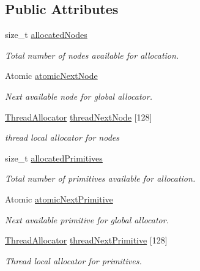 \subsection*{Public Attributes}
\begin{DoxyCompactItemize}
\item 
\hypertarget{classembree_1_1_builder_ad7a981fa7a2855b1efd27d5748ca564b}{
size\_\-t \hyperlink{classembree_1_1_builder_ad7a981fa7a2855b1efd27d5748ca564b}{allocatedNodes}}
\label{classembree_1_1_builder_ad7a981fa7a2855b1efd27d5748ca564b}

\begin{DoxyCompactList}\small\item\em Total number of nodes available for allocation. \item\end{DoxyCompactList}\item 
Atomic \hyperlink{classembree_1_1_builder_a5de33d69fa2c9fb5057672a268e4485e}{atomicNextNode}
\begin{DoxyCompactList}\small\item\em Next available node for global allocator. \item\end{DoxyCompactList}\item 
\hypertarget{classembree_1_1_builder_a9bcfa909ab6e789c27cb6007d18d0555}{
\hyperlink{structembree_1_1_builder_1_1_thread_allocator}{ThreadAllocator} \hyperlink{classembree_1_1_builder_a9bcfa909ab6e789c27cb6007d18d0555}{threadNextNode} \mbox{[}128\mbox{]}}
\label{classembree_1_1_builder_a9bcfa909ab6e789c27cb6007d18d0555}

\begin{DoxyCompactList}\small\item\em thread local allocator for nodes \item\end{DoxyCompactList}\item 
size\_\-t \hyperlink{classembree_1_1_builder_a2bf55a7c8cc541b2c8ebb6346195aa9f}{allocatedPrimitives}
\begin{DoxyCompactList}\small\item\em Total number of primitives available for allocation. \item\end{DoxyCompactList}\item 
Atomic \hyperlink{classembree_1_1_builder_a1f1348c5b8ba03a6396570823e44fc4c}{atomicNextPrimitive}
\begin{DoxyCompactList}\small\item\em Next available primitive for global allocator. \item\end{DoxyCompactList}\item 
\hyperlink{structembree_1_1_builder_1_1_thread_allocator}{ThreadAllocator} \hyperlink{classembree_1_1_builder_a83eb9ae6190fbd6e3dcb304aea6cbfd2}{threadNextPrimitive} \mbox{[}128\mbox{]}
\begin{DoxyCompactList}\small\item\em Thread local allocator for primitives. \item\end{DoxyCompactList}\end{DoxyCompactItemize}


